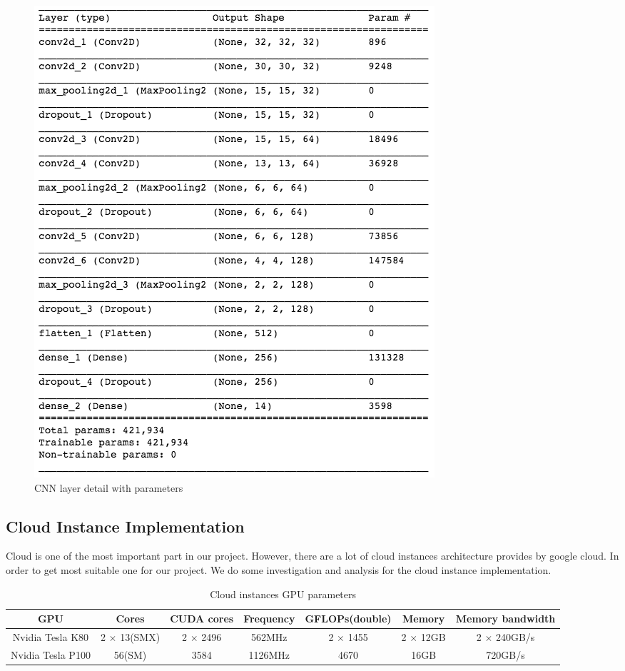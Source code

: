 \documentclass[conference]{IEEEtran}
\begin{document}
\begin{figure}[hb]
\centering
  \begin{minipage}{.4\textwidth}
    \centering
    \includegraphics[width=0.8\linewidth]{archi_param.png}
    \caption{CNN layer detail with parameters}
    \label{fig:fig_1}
  \end{minipage}
\end{figure}


\subsection{Cloud Instance Implementation}

Cloud is one of the most important part in our project. However, there are a lot of cloud instances architecture provides by google cloud. In order to get most suitable one for our project. We do some investigation and analysis for the cloud instance implementation.

\begin{table}
\caption{Cloud instances GPU parameters}
\centering
\begin{tabular}{|c|c|c|c|c|c|c|}
\hline
\textbf{GPU} & \textbf{Cores} & \textbf{CUDA cores} & \textbf{Frequency} & \textbf{GFLOPs(double)} & \textbf{Memory} & \textbf{Memory bandwidth}\\
\hline
Nvidia Tesla K80 & 2 $\times$ 13(SMX) & 2 $\times$ 2496 & 562MHz & 2 $\times$ 1455 & 2 $\times$ 12GB & 2 $\times$ 240GB/s \\
\hline
Nvidia Tesla P100 & 56(SM) & 3584 & 1126MHz & 4670 & 16GB & 720GB/s\\
\hline
\end{tabular}
\end{table}
\end{document}
